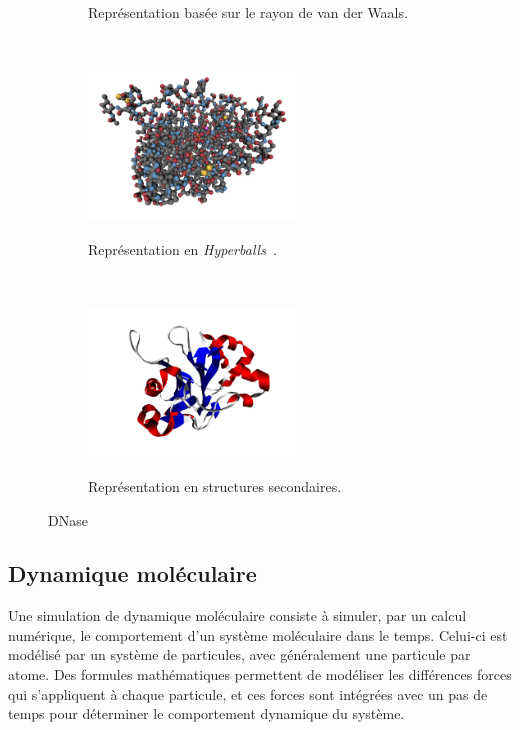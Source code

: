 \begin{figure}[htb]
\begin{subfigure}[t]{\subImgW}
            \caption{Représentation basée sur le rayon de van der Waals.}
            \label{fig:4awn_VdW}
        \end{subfigure}
        ~
        \begin{subfigure}[t]{\subImgW}
            \centering
            {\includegraphics[height=4cm]{./figures/ch1/4awn_HB}}
            \caption{Représentation en \emph{Hyperballs}~\cite{chavent2011gpu}.}
            \label{fig:amino_acid_structure}
        \end{subfigure}
        ~
        \begin{subfigure}[t]{\subImgW}
            \centering
            {\includegraphics[height=4cm]{./figures/ch1/4awn_ss}}
            \caption{Représentation en structures secondaires.}
            \label{fig:4awn_ss}
        \end{subfigure}
        \caption{DNase}
        \label{fig:4awn_atom}
    \end{figure}
    
	\subsection{Dynamique moléculaire}
	Une simulation de dynamique moléculaire consiste à simuler, par un calcul numérique, le comportement d'un système moléculaire dans le temps. Celui-ci est modélisé par un système de particules, avec généralement une particule par atome. Des formules mathématiques permettent de modéliser les différences forces qui s'appliquent à chaque particule, et ces forces sont intégrées avec un pas de temps pour déterminer le comportement dynamique du système.
    
